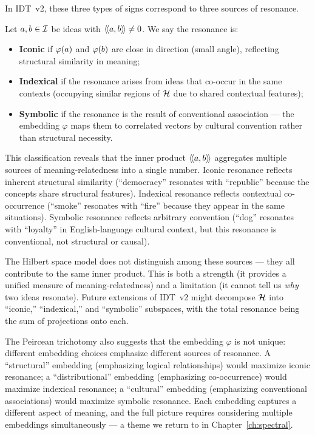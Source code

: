 In IDT~v2, these three types of signs correspond to three sources of resonance.

\begin{definition}
\label{def:peirce-resonance}
Let $a, b \in \mathcal{I}$ be ideas with $\langle\!\langle a, b \rangle\!\rangle \neq 0$. We say the resonance is:
\begin{itemize}
\item \textbf{Iconic} if $\varphi(a)$ and $\varphi(b)$ are close in direction
(small angle), reflecting structural similarity in meaning;
\item \textbf{Indexical} if the resonance arises from ideas that co-occur
in the same contexts (occupying similar regions of $\mathcal{H}$ due to shared
contextual features);
\item \textbf{Symbolic} if the resonance is the result of conventional
association --- the embedding $\varphi$ maps them to correlated vectors by
cultural convention rather than structural necessity.
\end{itemize}
\end{definition}

\begin{interpretation}
\label{interp:peirce}
This classification reveals that the inner product $\langle\!\langle a, b \rangle\!\rangle$ aggregates
multiple sources of meaning-relatedness into a single number. Iconic resonance
reflects inherent structural similarity (``democracy'' resonates with
``republic'' because the concepts share structural features). Indexical resonance
reflects contextual co-occurrence (``smoke'' resonates with ``fire'' because
they appear in the same situations). Symbolic resonance reflects arbitrary
convention (``dog'' resonates with ``loyalty'' in English-language cultural
context, but this resonance is conventional, not structural or causal).

The Hilbert space model does not distinguish among these sources --- they all
contribute to the same inner product. This is both a strength (it provides a
unified measure of meaning-relatedness) and a limitation (it cannot tell us
\emph{why} two ideas resonate). Future extensions of IDT~v2 might decompose
$\mathcal{H}$ into ``iconic,'' ``indexical,'' and ``symbolic'' subspaces, with
the total resonance being the sum of projections onto each.

The Peircean trichotomy also suggests that the embedding $\varphi$ is not
unique: different embedding choices emphasize different sources of resonance.
A ``structural'' embedding (emphasizing logical relationships) would maximize
iconic resonance; a ``distributional'' embedding (emphasizing co-occurrence)
would maximize indexical resonance; a ``cultural'' embedding (emphasizing
conventional associations) would maximize symbolic resonance. Each embedding
captures a different aspect of meaning, and the full picture requires
considering multiple embeddings simultaneously --- a theme we return to in
Chapter~\ref{ch:spectral}.
\end{interpretation}


